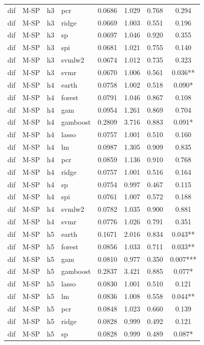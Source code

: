 \begin{ThreePartTable}
\begin{longtable}[t]{llclcccc}
dif & M-SP & h3 & pcr & 0.0686 & 1.029 & 0.768 & 0.294\\
dif & M-SP & h3 & ridge & 0.0669 & 1.003 & 0.551 & 0.196\\
dif & M-SP & h3 & sp & 0.0697 & 1.046 & 0.920 & 0.355\\
dif & M-SP & h3 & spi & 0.0681 & 1.021 & 0.755 & 0.140\\
dif & M-SP & h3 & svmlw2 & 0.0674 & 1.012 & 0.735 & 0.323\\
dif & M-SP & h3 & svmr & 0.0670 & 1.006 & 0.561 & 0.036**\\
\addlinespace
dif & M-SP & h4 & earth & 0.0758 & 1.002 & 0.518 & 0.090*\\
dif & M-SP & h4 & forest & 0.0791 & 1.046 & 0.867 & 0.108\\
dif & M-SP & h4 & gam & 0.0954 & 1.261 & 0.869 & 0.704\\
dif & M-SP & h4 & gamboost & 0.2809 & 3.716 & 0.883 & 0.091*\\
dif & M-SP & h4 & lasso & 0.0757 & 1.001 & 0.510 & 0.160\\
dif & M-SP & h4 & lm & 0.0987 & 1.305 & 0.909 & 0.835\\
dif & M-SP & h4 & pcr & 0.0859 & 1.136 & 0.910 & 0.768\\
dif & M-SP & h4 & ridge & 0.0757 & 1.001 & 0.516 & 0.164\\
dif & M-SP & h4 & sp & 0.0754 & 0.997 & 0.467 & 0.115\\
dif & M-SP & h4 & spi & 0.0761 & 1.007 & 0.572 & 0.188\\
dif & M-SP & h4 & svmlw2 & 0.0782 & 1.035 & 0.900 & 0.881\\
dif & M-SP & h4 & svmr & 0.0776 & 1.026 & 0.791 & 0.351\\
\addlinespace
dif & M-SP & h5 & earth & 0.1671 & 2.016 & 0.834 & 0.043**\\
dif & M-SP & h5 & forest & 0.0856 & 1.033 & 0.711 & 0.033**\\
dif & M-SP & h5 & gam & 0.0810 & 0.977 & 0.350 & 0.007***\\
dif & M-SP & h5 & gamboost & 0.2837 & 3.421 & 0.885 & 0.077*\\
dif & M-SP & h5 & lasso & 0.0830 & 1.001 & 0.510 & 0.121\\
dif & M-SP & h5 & lm & 0.0836 & 1.008 & 0.558 & 0.044**\\
dif & M-SP & h5 & pcr & 0.0848 & 1.023 & 0.660 & 0.139\\
dif & M-SP & h5 & ridge & 0.0828 & 0.999 & 0.492 & 0.121\\
dif & M-SP & h5 & sp & 0.0828 & 0.999 & 0.489 & 0.087*\\

\end{longtable}
\end{ThreePartTable}

